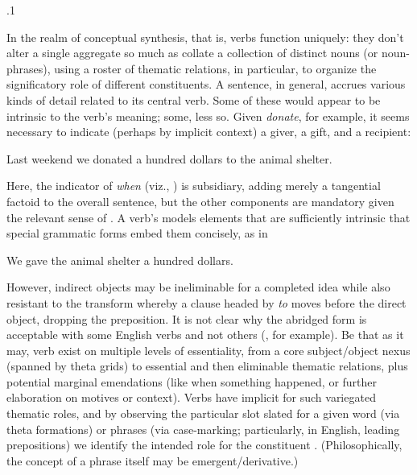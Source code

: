 \documentclass[11pt, twocolumn]{article}
\begin{document}
{{\p.1{%
In the realm of conceptual synthesis, that is, verbs
function uniquely: they don't alter a single aggregate so
much as collate a collection of distinct nouns
(or noun-phrases), using a roster of thematic relations,
in particular, to organize
the significatory role of different constituents.
A sentence, in general, accrues various kinds of detail
related to its central verb. Some of these
would appear to be intrinsic to the verb's meaning; some, less
so. Given \textit{donate}, for example, it seems necessary
to indicate (perhaps by implicit context) a giver, a gift,
and a recipient:

\begin{exsGroup}

\exsItem{}  Last weekend we donated a hundred dollars to the animal shelter.

\end{exsGroup}

\nip{}%
Here, the indicator of \textit{when} (viz., ) is subsidiary, adding merely a tangential
factoid to the overall sentence, but the other components are
mandatory given the relevant sense of . A verb's
 models elements that are sufficiently
intrinsic that special grammatic forms embed them concisely,
as in

\begin{exsGroup}

\exsItem{}  We gave the animal shelter a hundred dollars.

\end{exsGroup}

\nip{}%
However, indirect objects may be ineliminable for a completed idea while
also resistant to the transform whereby a clause headed
by \textit{to} moves before the direct object, dropping the preposition.
It is not clear why the abridged  form is acceptable
with some English verbs and not others (, for example). Be that as it may,
verb  exist on multiple levels of essentiality,
from a core subject/object nexus (spanned by theta grids) to
essential and then eliminable thematic relations, plus potential marginal
emendations (like when something happened, or further elaboration
on motives or context). Verbs have implicit
 for such variegated thematic roles, and by observing
the particular slot slated for a given word (via theta formations)
or phrases (via case-marking; particularly, in English, leading
prepositions) \pgl{}we identify the intended role for the constituent . (Philosophically,
the concept of a phrase itself may be emergent/derivative.)
}%

}}
\end{document}
